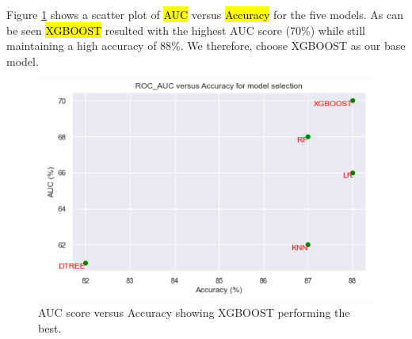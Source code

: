 Figure \ref{fig:auc_vs_accuracy} shows a scatter plot of \hl{AUC} versus \hl{Accuracy} for the five models. As can be seen \hl{XGBOOST} resulted with the highest AUC score (70\%) while still maintaining a high accuracy of 88\%. We therefore, choose XGBOOST as our base model. 

\begin{figure}[tbh]
\centering
\includegraphics[width = 1.0\hsize]{./resources/img/fig_auc_vs_accuracy.png}
\caption{AUC score versus Accuracy showing XGBOOST performing the best.} 
\label{fig:auc_vs_accuracy}
\end{figure}

